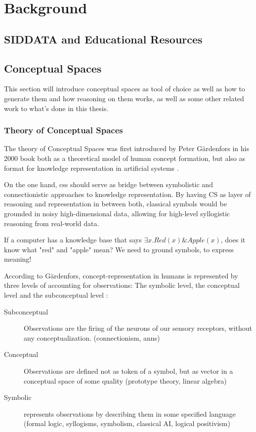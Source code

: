 \chapter{Background}


\section{SIDDATA and Educational Resources}


\section{Conceptual Spaces}

This section will introduce conceptual spaces as tool of choice as well as how to generate them and how reasoning on them works, as well as some other related work to what's done in this thesis.

\subsection*{Theory of Conceptual Spaces}

The theory of Conceptual Spaces was first introduced by Peter Gärdenfors in his 2000 book  \cite{Gardenfors2000a} both as a theoretical model of human concept formation, but also as format for knowledge representation in artificial systems \cite{Gardenfors2004}. 

On the one hand, \glspl{cs} should serve as bridge between symbolistic and connectionistic approaches to knowledge representation. By having CS as layer of reasoning and representation in between both, classical symbols would be grounded in noisy high-dimensional data, allowing for high-level syllogistic reasoning from real-world data. 

If a computer has a knowledge base that says $\exists x.Red(x) \& Apple(x)$, does it know what "red" and "apple" mean? We need to ground symbols, to express meaning!

According to Gärdenfors, concept-representation in humans is represented by three levels of accounting for observations: The symbolic level, the conceptual level and the subconceptual level \cite[204]{Gardenfors2000a}:
\begin{description}
    \item[Subconceptual] Observations are the firing of the neurons of our sensory receptors, without any conceptualization.  (connectionism, \glspl{ann})
    \item[Conceptual] Observations are defined not as token of a symbol, but as vector in a conceptual space of some quality  (prototype theory, linear algebra)
    \item[Symbolic] represents observations by describing them in some specified language (formal logic, syllogisms, symbolism, classical AI, logical positivism)
\end{description}

